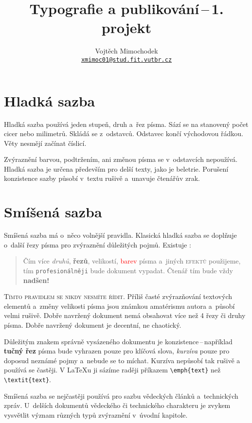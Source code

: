 \documentclass[a4paper,10pt, twocolumn]{article}
\title{Typografie a publikování\,--\,1. projekt}
\author{Vojtěch Mimochodek \\ \href{mailto:xmimoc01@stud.fit.vutbr.cz}{\texttt{xmimoc01@stud.fit.vutbr.cz}}}
\date{}
\begin{document}
	
\maketitle

\section{Hladká sazba}

Hladká sazba používá jeden stupeň, druh a~řez písma.
Sází se na stanovený počet cicer nebo milimetrů.
Skládá se z~odstavců. Odstavec končí východovou řádkou.
Věty nesmějí začínat číslicí.

Zvýraznění barvou, podtržením, ani změnou písma se v~odstavcích nepoužívá.
Hladká sazba je určena především pro delší texty, jako je beletrie.
Porušení konzistence sazby působí v~textu rušivě a~unavuje čtenářův zrak.

\section{Smíšená sazba}

Smíšená sazba má o~něco volnější pravidla.
Klasická hladká sazba se doplňuje o~další řezy písma pro zvýraznění důležitých pojmů.
Existuje :

\begin{quotation}
Čím více {\itshape druhů}, {\bfseries řezů}, {\tiny velikostí}, {\textcolor{red}{barev}} písma a~jiných \textsc{efektů} použijeme, tím \texttt{profesionálněji} bude {\Large{\selectfont dokument}} vypadat.
{\huge Č}{\LARGE t}{\Large e}{\large n}{\normalsize á}{\small ř} {\footnotesize t}{\scriptsize í}{\tiny m} bude vždy {\Huge{\textbf{nadšen!}}}
\end{quotation}

\textsc{Tímto pravidlem se nikdy nesmíte řídit}. Příliš časté zvýrazňování textových elementů a~změny velikosti písma jsou známkou amatérismu autora a~působí velmi rušivě.
Dobře navržený dokument nemá obsahovat více než 4 řezy či druhy písma.
Dobře navržený dokument je decentní, ne chaotický.

Důležitým znakem správně vysázeného dokumentu je konzistence\,--\,například {\bfseries tučný řez} písma bude vyhrazen pouze pro klíčová slova, {\itshape kurzíva} pouze pro doposud neznámé pojmy a~nebude se to míchat.
Kurzíva nepůsobí tak rušivě a používá se častěji.
V {\LaTeX}u ji sázíme raději příkazem \verb|\emph{text}| než \verb|\textit{text}|.

Smíšená sazba se nejčastěji používá pro sazbu vědeckých článků a~technických zpráv.
U~delších dokumentů vědeckého či technického charakteru je zvykem vysvětlit význam různých typů zvýraznění v~úvodní kapitole.
\end{document}
